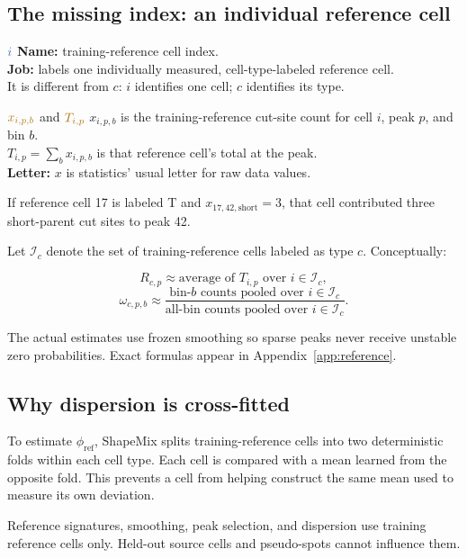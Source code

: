 \documentclass[11pt]{article}
\newcommand{\fixedq}[1]{\textcolor{fixedblue!75!black}{#1}}
\newcommand{\obsq}[1]{\textcolor{observedgold!80!black}{#1}}
\begin{document}
\subsection{The missing index: an individual reference cell}

\begin{newvar}{\(\fixedq{i}\)}
\textbf{Name:} training-reference cell index.\\
\textbf{Job:} labels one individually measured, cell-type-labeled reference cell.\\
It is different from \(c\): \(i\) identifies one cell; \(c\) identifies its type.
\end{newvar}

\begin{newvar}{\(\obsq{x_{i,p,b}}\) and \(\obsq{T_{i,p}}\)}
\(x_{i,p,b}\) is the training-reference cut-site count for cell \(i\), peak \(p\),
and bin \(b\).\\
\(T_{i,p}=\sum_bx_{i,p,b}\) is that reference cell's total at the peak.\\
\textbf{Letter:} \(x\) is statistics' usual letter for raw data values.
\end{newvar}

If reference cell 17 is labeled T and \(x_{17,42,\mathrm{short}}=3\), that cell
contributed three short-parent cut sites to peak 42.

Let \(\mathcal I_c\) denote the set of training-reference cells labeled as type
\(c\). Conceptually:

\[
R_{c,p}
\approx
\text{average of }T_{i,p}\text{ over }i\in\mathcal I_c,
\]
\[
\omega_{c,p,b}
\approx
\frac{\text{bin-}b\text{ counts pooled over }i\in\mathcal I_c}
{\text{all-bin counts pooled over }i\in\mathcal I_c}.
\]

The actual estimates use frozen smoothing so sparse peaks never receive unstable
zero probabilities. Exact formulas appear in Appendix~\ref{app:reference}.

\subsection{Why dispersion is cross-fitted}

To estimate \(\phi_{\mathrm{ref}}\), ShapeMix splits training-reference cells into
two deterministic folds within each cell type. Each cell is compared with a mean
learned from the opposite fold. This prevents a cell from helping construct the
same mean used to measure its own deviation.

\begin{bigidea}
Reference signatures, smoothing, peak selection, and dispersion use training
reference cells only. Held-out source cells and pseudo-spots cannot influence
them.
\end{bigidea}
\end{document}
